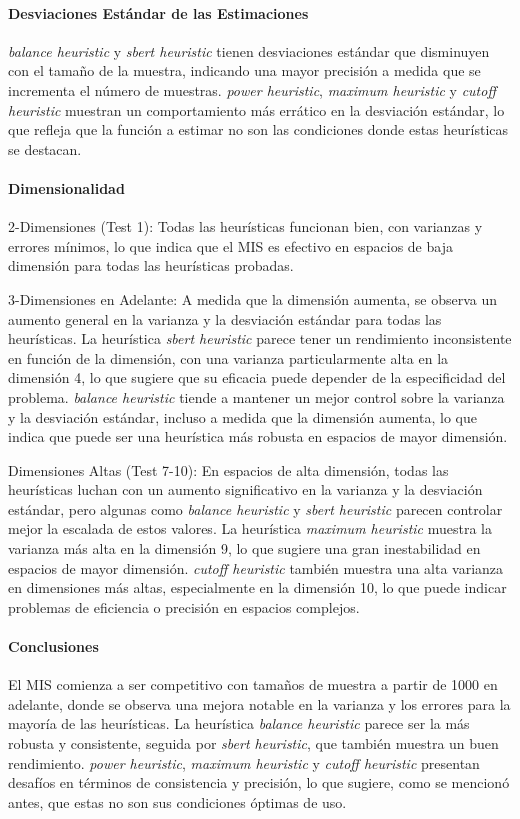\documentclass{article}
\begin{document}
\paragraph{Desviaciones Estándar de las Estimaciones}
\textit{balance heuristic} y \textit{sbert heuristic} tienen desviaciones estándar que disminuyen con el tamaño de la muestra, indicando una mayor precisión a medida que se incrementa el número de muestras.
\textit{power heuristic}, \textit{maximum heuristic} y \textit{cutoff heuristic} muestran un comportamiento más errático en la desviación estándar, lo que refleja que la función a estimar no son las condiciones donde estas heurísticas se destacan.

\paragraph{Dimensionalidad}
2-Dimensiones (Test 1): Todas las heurísticas funcionan bien, con varianzas y errores mínimos, lo que indica que el MIS es efectivo en espacios de baja dimensión para todas las heurísticas probadas.

3-Dimensiones en Adelante: A medida que la dimensión aumenta, se observa un aumento general en la varianza y la desviación estándar para todas las heurísticas. La heurística \textit{sbert heuristic} parece tener un rendimiento inconsistente en función de la dimensión, con una varianza particularmente alta en la dimensión 4, lo que sugiere que su eficacia puede depender de la especificidad del problema.
\textit{balance heuristic} tiende a mantener un mejor control sobre la varianza y la desviación estándar, incluso a medida que la dimensión aumenta, lo que indica que puede ser una heurística más robusta en espacios de mayor dimensión.

Dimensiones Altas (Test 7-10): En espacios de alta dimensión, todas las heurísticas luchan con un aumento significativo en la varianza y la desviación estándar, pero algunas como \textit{balance heuristic} y \textit{sbert heuristic} parecen controlar mejor la escalada de estos valores.
La heurística \textit{maximum heuristic} muestra la varianza más alta en la dimensión 9, lo que sugiere una gran inestabilidad en espacios de mayor dimensión.
\textit{cutoff heuristic} también muestra una alta varianza en dimensiones más altas, especialmente en la dimensión 10, lo que puede indicar problemas de eficiencia o precisión en espacios complejos.

\paragraph{Conclusiones}
El MIS comienza a ser competitivo con tamaños de muestra a partir de 1000 en adelante, donde se observa una mejora notable en la varianza y los errores para la mayoría de las heurísticas. La heurística \textit{balance heuristic} parece ser la más robusta y consistente, seguida por \textit{sbert heuristic}, que también muestra un buen rendimiento. \textit{power heuristic}, \textit{maximum heuristic} y \textit{cutoff heuristic} presentan desafíos en términos de consistencia y precisión, lo que sugiere, como se mencionó antes, que estas no son sus condiciones óptimas de uso.
\end{document}
